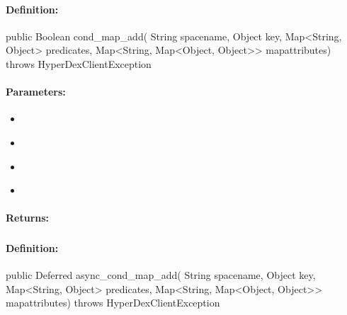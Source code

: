 \paragraph{Definition:}
\begin{javacode}
public Boolean cond_map_add(
        String spacename,
        Object key,
        Map<String, Object> predicates,
        Map<String, Map<Object, Object>> mapattributes) throws HyperDexClientException
\end{javacode}

\paragraph{Parameters:}
\begin{itemize}[noitemsep]
\item {}\\

\item {}\\

\item {}\\

\item {}\\

\end{itemize}

\paragraph{Returns:}


\pagebreak
\subsubsection{}
\label{api:java:async_cond_map_add}


\paragraph{Definition:}
\begin{javacode}
public Deferred async_cond_map_add(
        String spacename,
        Object key,
        Map<String, Object> predicates,
        Map<String, Map<Object, Object>> mapattributes) throws HyperDexClientException
\end{javacode}

